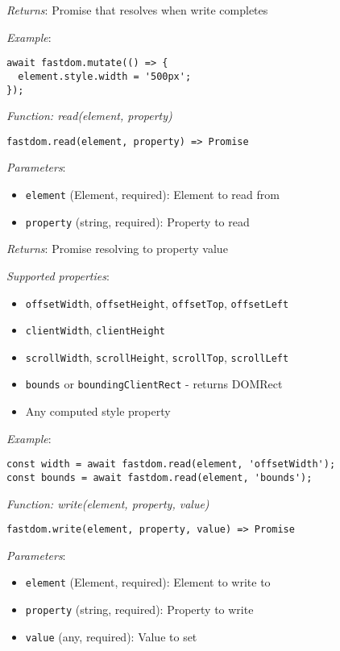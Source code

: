 \documentclass[11pt]{article}
\begin{document}
\emph{Returns}: Promise that resolves when write completes

\emph{Example}:
\begin{verbatim}
await fastdom.mutate(() => {
  element.style.width = '500px';
});
\end{verbatim}

\emph{Function: read(element, property)}

\begin{verbatim}
fastdom.read(element, property) => Promise
\end{verbatim}

\emph{Parameters}:

\begin{itemize}
\item \texttt{element} (Element, required): Element to read from
\item \texttt{property} (string, required): Property to read
\end{itemize}

\emph{Returns}: Promise resolving to property value

\emph{Supported properties}:
\begin{itemize}
\item \texttt{offsetWidth}, \texttt{offsetHeight}, \texttt{offsetTop}, \texttt{offsetLeft}
\item \texttt{clientWidth}, \texttt{clientHeight}
\item \texttt{scrollWidth}, \texttt{scrollHeight}, \texttt{scrollTop}, \texttt{scrollLeft}
\item \texttt{bounds} or \texttt{boundingClientRect} - returns DOMRect
\item Any computed style property
\end{itemize}

\emph{Example}:
\begin{verbatim}
const width = await fastdom.read(element, 'offsetWidth');
const bounds = await fastdom.read(element, 'bounds');
\end{verbatim}

\emph{Function: write(element, property, value)}

\begin{verbatim}
fastdom.write(element, property, value) => Promise
\end{verbatim}

\emph{Parameters}:

\begin{itemize}
\item \texttt{element} (Element, required): Element to write to
\item \texttt{property} (string, required): Property to write
\item \texttt{value} (any, required): Value to set
\end{itemize}
\end{document}
